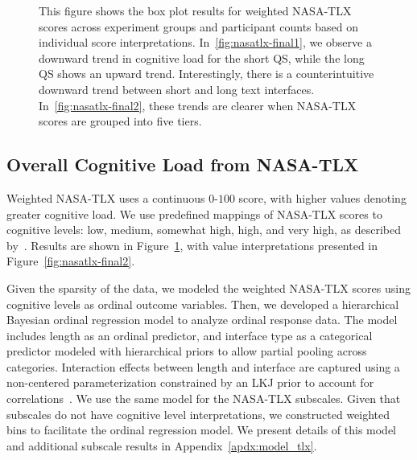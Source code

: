 \begin{figure}[htbp]
    \caption{This figure shows the box plot results for weighted NASA-TLX scores across experiment groups and participant counts based on individual score interpretations. In~\ref{fig:nasatlx-final1}, we observe a downward trend in cognitive load for the short QS, while the long QS shows an upward trend. Interestingly, there is a counterintuitive downward trend between short and long text interfaces. In~\ref{fig:nasatlx-final2}, these trends are clearer when NASA-TLX scores are grouped into five tiers.}
    \label{fig:nasatlx-final}
\end{figure}

\subsection{Overall Cognitive Load from NASA-TLX}
\label{sec:cog_overall}
Weighted NASA-TLX uses a continuous $0$-$100$ score, with higher values denoting greater cognitive load. We use predefined mappings of NASA-TLX scores to cognitive levels: low, medium, somewhat high, high, and very high, as described by~\textcite{hart1988development}. Results are shown in Figure~\ref{fig:nasatlx-final}, with value interpretations presented in Figure~\ref{fig:nasatlx-final2}.

Given the sparsity of the data, we modeled the weighted NASA-TLX scores using cognitive levels as ordinal outcome variables. Then, we developed a hierarchical Bayesian ordinal regression model to analyze ordinal response data. The model includes length as an ordinal predictor, and interface type as a categorical predictor modeled with hierarchical priors to allow partial pooling across categories. Interaction effects between length and interface are captured using a non-centered parameterization constrained by an LKJ prior to account for correlations~\cite{mcelreath2018statistical}. We use the same model for the NASA-TLX subscales. Given that subscales do not have cognitive level interpretations, we constructed weighted bins to facilitate the ordinal regression model. We present details of this model and additional subscale results in Appendix~\ref{apdx:model_tlx}.

